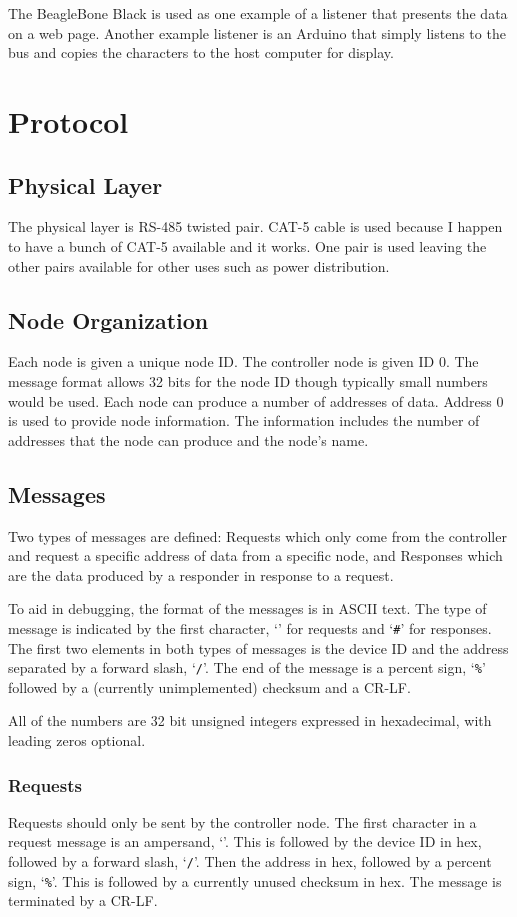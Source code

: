 \documentclass[10pt, openany, draft]{article}
\begin{document}
The BeagleBone Black is used as one example of a listener that presents the data on a web page.  Another example listener is an Arduino that simply listens to the bus and copies the characters to the host computer for display.

\section{Protocol}
\subsection{Physical Layer}
The physical layer is RS-485 twisted pair.  CAT-5 cable is used because I happen to have a bunch of CAT-5 available and it works.  One pair is used leaving the other pairs available for other uses such as power distribution.

\subsection{Node Organization}
Each node is given a unique node ID.  The controller node is given ID 0.  The message format allows 32 bits for the node ID though typically small numbers would be used.  Each node can produce a number of addresses of data.  Address 0 is used to provide node information.  The information includes the number of addresses that the node can produce and the node's name.

\subsection{Messages}
Two types of messages are defined: Requests which only come from the controller and request a specific address of data from a specific node, and Responses which are the data produced by a responder in response to a request.

To aid in debugging, the format of the messages is in ASCII text.  The type of message is indicated by the first character, `\texttt{\@}' for requests and `\texttt{\#}' for responses.  The first two elements in both types of messages is the device ID and the address separated by a forward slash, `\texttt{/}'.  The end of the message is a percent sign, `\texttt{\%}' followed by a (currently unimplemented) checksum and a CR-LF.

All of the numbers are 32 bit unsigned integers expressed in hexadecimal, with leading zeros optional.  

\subsubsection{Requests}
Requests should only be sent by the controller node.  The first character in a request message is an ampersand, `\texttt{\@}'.  This is followed by the device ID in hex, followed by a forward slash, `\texttt{/}'.  Then the address in hex, followed by a percent sign, `\texttt{\%}'.  This is followed by a currently unused checksum in hex.  The message is terminated by a CR-LF.
\end{document}
